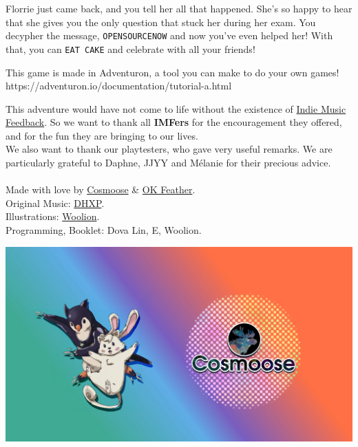 \documentclass{article}
\newcommand{\bbro}[1] {\textbf{\textcolor{darksienna}{#1}}}
\newcommand{\bckg}[1]{\AddToShipoutPictureBG*{\texttt{[image: \#1]}}}
\begin{document}
Florrie just came back, and you tell her all that happened.
She's so happy to hear that she gives you the only question that stuck her during her exam.
You decypher the message, \texttt{OPENSOURCENOW} and now you've even helped her!
With that, you can \texttt{EAT CAKE} and celebrate with all your friends!

\clearpage

\bckg{img/bg}

This game is made in Adventuron, a tool you can make to do your own games!
https://adventuron.io/documentation/tutorial-a.html

This adventure would have not come to life without the existence of \href{https://indiemusicfeedback.com}{Indie Music Feedback}.
So we want to thank all \bbro{IMFers} for the encouragement they offered, and for the fun they are bringing to our lives.\\

We also want to thank our playtesters, who gave very useful remarks. We are particularly grateful to Daphne, JJYY and Mélanie for their precious advice.\\

\phantom{*}\\
Made with love by \href{https://cosmoose.org/}{Cosmoose} \& \href{https://okfeather.com/}{OK Feather}.\\
Original Music: \href{https://linktr.ee/dhxp}{DHXP}.\\
Illustrations: \href{https://twitter.com/wooliondraws}{Woolion}.\\
Programming, Booklet: Dova Lin, E, Woolion.

\vspace*{\fill}

\begin{center}
    \includegraphics[height=.3\paperheight]{img/ccend}
\end{center}


\clearpage
\end{document}
